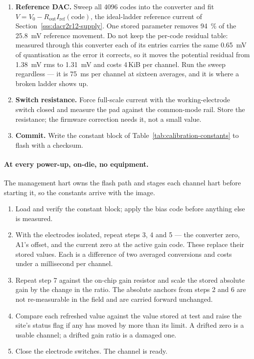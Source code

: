 \begin{enumerate}[leftmargin=*, itemsep=2pt]
  and the gain-reference switch, and repeat the gain measurement against the
  internal resistor at the same codes. This ties the on-chip ratio to the
  external ampere once, so that every later gain check needs no equipment.
\item \textbf{Reference DAC.} Sweep all 4096 codes into the converter and fit
  \(V = V_0 - R_{\mathrm{out}} I_{\mathrm{ref}}(\mathrm{code})\), the
  ideal-ladder reference current of Section~\ref{sss:dacr2r12-supply}. One
  stored parameter removes \SI{94}{\percent} of the \SI{25.8}{\milli\volt}
  reference movement. Do not keep the per-code residual table: measured through
  this converter each of its entries carries the same \SI{0.65}{\milli\volt} of
  quantisation as the error it corrects, so it moves the potential residual from
  \SI{1.38}{\milli\volt} rms to \SI{1.31}{\milli\volt} and costs
  4\,KiB per channel. Run the sweep regardless --- it is
  \SI{75}{\milli\second} per channel at sixteen averages, and it is where a
  broken ladder shows up.
\item \textbf{Switch resistance.} Force full-scale current with the
  working-electrode switch closed and measure the pad against the common-mode
  rail. Store the resistance; the firmware correction needs it, not a small
  value.
\item \textbf{Commit.} Write the constant block of
  Table~\ref{tab:calibration-constants} to flash with a checksum.
\end{enumerate}

\paragraph{At every power-up, on-die, no equipment.} The management hart owns
the flash path and stages each channel hart before starting it, so the constants
arrive with the image.

\begin{enumerate}[leftmargin=*, itemsep=2pt, resume]
\item Load and verify the constant block; apply the bias code before anything
  else is measured.
\item With the electrodes isolated, repeat steps 3, 4 and 5 --- the converter
  zero, A1's offset, and the current zero at the active gain code. These replace
  their stored values. Each is a difference of two averaged conversions and
  costs under a millisecond per channel.
\item Repeat step 7 against the on-chip gain resistor and scale the stored
  absolute gain by the change in the ratio. The absolute anchors from steps 2
  and 6 are not re-measurable in the field and are carried forward unchanged.
\item Compare each refreshed value against the value stored at test and raise
  the site's status flag if any has moved by more than its limit. A drifted zero
  is a usable channel; a drifted gain ratio is a damaged one.
\item Close the electrode switches. The channel is ready.
\end{enumerate}


